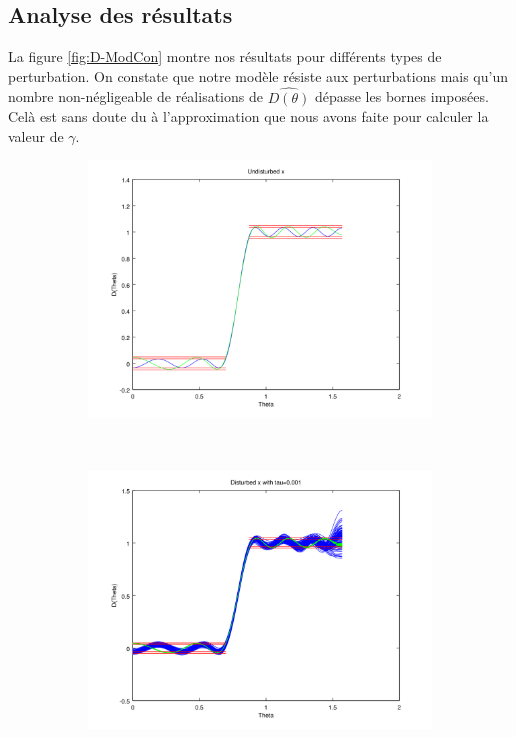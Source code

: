 \subsection{Analyse des résultats}
La figure \ref{fig:D-ModCon} montre nos résultats pour différents types de perturbation. On constate que notre modèle résiste aux perturbations mais qu'un nombre non-négligeable de réalisations de $\hat{D(\theta)}$ dépasse les bornes imposées. Celà est sans doute du à l'approximation que nous avons faite pour calculer la valeur de $\gamma$.
\begin{figure}[h!]
  \centering
  \begin{subfigure}[b]{0.32\textwidth}
  \includegraphics[width=\textwidth]{D-ModRobustCon.png}
  \end{subfigure}
  ~ 
 \begin{subfigure}[b]{0.32\textwidth}
  \includegraphics[width=\textwidth]{D-ModRobustCon-tau0001.png}

\end{subfigure}
\end{figure}
